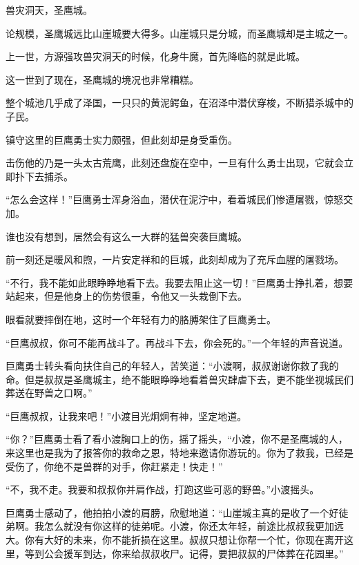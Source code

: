 
\begin{this_body}

兽灾洞天，圣鹰城。

论规模，圣鹰城远比山崖城要大得多。山崖城只是分城，而圣鹰城却是主城之一。

上一世，方源强攻兽灾洞天的时候，化身牛魔，首先降临的就是此城。

这一世到了现在，圣鹰城的境况也非常糟糕。

整个城池几乎成了泽国，一只只的黄泥鳄鱼，在沼泽中潜伏穿梭，不断猎杀城中的子民。

镇守这里的巨鹰勇士实力颇强，但此刻却是身受重伤。

击伤他的乃是一头太古荒鹰，此刻还盘旋在空中，一旦有什么勇士出现，它就会立即扑下去捕杀。

“怎么会这样！”巨鹰勇士浑身浴血，潜伏在泥泞中，看着城民们惨遭屠戮，惊怒交加。

谁也没有想到，居然会有这么一大群的猛兽突袭巨鹰城。

前一刻还是暖风和煦，一片安定祥和的巨城，此刻却成为了充斥血腥的屠戮场。

“不行，我不能如此眼睁睁地看下去。我要去阻止这一切！”巨鹰勇士挣扎着，想要站起来，但是他身上的伤势很重，令他又一头栽倒下去。

眼看就要摔倒在地，这时一个年轻有力的胳膊架住了巨鹰勇士。

“巨鹰叔叔，你可不能再战斗了。再战斗下去，你会死的。”一个年轻的声音说道。

巨鹰勇士转头看向扶住自己的年轻人，苦笑道：“小渡啊，叔叔谢谢你救了我的命。但是叔叔是圣鹰城主，绝不能眼睁睁地看着兽灾肆虐下去，更不能坐视城民们葬送在野兽之口啊。”

“巨鹰叔叔，让我来吧！”小渡目光炯炯有神，坚定地道。

“你？”巨鹰勇士看了看小渡胸口上的伤，摇了摇头，“小渡，你不是圣鹰城的人，来这里也是我为了报答你的救命之恩，特地来邀请你游玩的。你为了救我，已经是受伤了，你绝不是兽群的对手，你赶紧走！快走！”

“不，我不走。我要和叔叔你并肩作战，打跑这些可恶的野兽。”小渡摇头。

巨鹰勇士感动了，他拍拍小渡的肩膀，欣慰地道：“山崖城主真的是收了一个好徒弟啊。我怎么就没有你这样的徒弟呢。小渡，你还太年轻，前途比叔叔我更加远大。你有大好的未来，你不能折损在这里。叔叔只想让你帮一个忙，你现在离开这里，等到公会援军到达，你来给叔叔收尸。记得，要把叔叔的尸体葬在花园里。”


\end{this_body}
